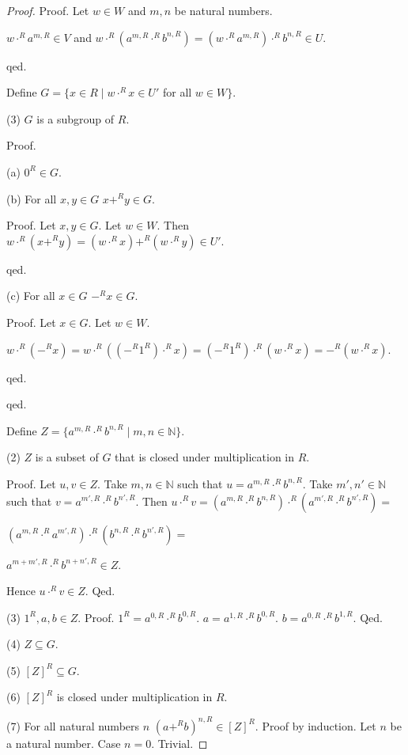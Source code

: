 \documentclass[11pt]{article}
\begin{document}
\begin{forthel}
\begin{proof}
Proof. Let $w \in W$ and $m,n$ be natural numbers.

$w \cdot^{R} a^{m,R} \in V$ and
$w \cdot^{R} (a^{m,R} \cdot^{R} b^{n,R}) =
(w \cdot^{R} a^{m,R}) \cdot^{R} b^{n,R} \in U$.
 
qed.

Define $G = \{x \in R \mid w \cdot^{R} x \in U'$ for all $w \in W\}$.

(3) $G$ is a subgroup of $R$. 

Proof.
 
(a) $0^{R} \in G$.

(b) For all $x,y \in G$ $x +^{R} y \in G$.

Proof. Let $x,y \in G$.
Let $w \in W$. Then
$w \cdot^{R} (x +^{R} y)
= (w \cdot^{R} x) +^{R} (w \cdot^{R} y) \in U'$.

qed.

(c) For all $x \in G$ $-^{R} x \in G$.

Proof. Let $x \in G$. Let $w \in W$.

$w \cdot^{R} (-^{R} x) = 
w \cdot^{R} ((-^{R} 1^{R}) \cdot^{R} x) =
(-^{R} 1^{R}) \cdot^{R} (w \cdot^{R} x) =
-^{R} (w \cdot^{R} x)
$.

qed.

qed.

Define $Z = \{a^{m,R} \cdot^{R} b^{n,R} \mid m,n \in \mathbb{N}\}$.

(2) $Z$ is a subset of $G$ that is closed under multiplication in $R$.

Proof.
Let $u,v \in Z$.
Take $m,n \in \mathbb{N}$ such that
$u = a^{m,R} \cdot^{R} b^{n,R}$.
Take $m',n' \in \mathbb{N}$ such that
$v = a^{m',R} \cdot^{R} b^{n',R}$.
Then
$u \cdot^{R} v = 
(a^{m,R} \cdot^{R} b^{n,R}) \cdot^{R} (a^{m',R} \cdot^{R} b^{n',R}) =$

$(a^{m,R} \cdot^{R} a^{m',R}) \cdot^{R} (b^{n,R} \cdot^{R} b^{n',R}) =$

$a^{m+m',R} \cdot^{R} b^{n+n',R} \in Z$.

Hence $u \cdot^{R} v \in Z$.
Qed.

(3) $1^{R},a,b \in Z$.
Proof.
$1^{R} = a^{0,R} \cdot^{R} b^{0,R}$.
$a = a^{1,R} \cdot^{R} b^{0,R}$.
$b = a^{0,R} \cdot^{R} b^{1,R}$.
Qed.

(4) $Z \subseteq G$.

(5) $[Z]^{R} \subseteq G$.

(6) $[Z]^{R}$ is closed under multiplication in $R$.

(7) For all natural numbers $n$ $(a +^{R} b)^{n,R} \in [Z]^{R}$.
Proof by induction. Let $n$ be a natural number.
Case $n = 0$. Trivial.


\end{proof}
\end{forthel}
\end{document}
